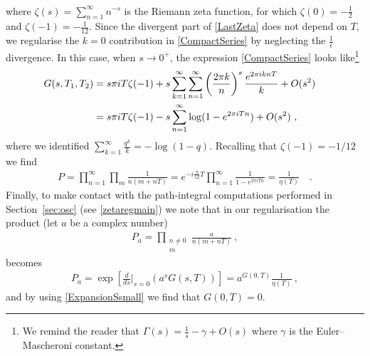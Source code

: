 \documentclass[11pt]{article}
\numberwithin{equation}{section}
\begin{document}
\begin{appendix}
\begin{align}
\label{LastZeta}
\end{align}
where $\zeta(s)=\sum_{n=1}^{\infty}n^{-s}$ is the Riemann zeta function, for which $\zeta(0)=-\frac12$ and $\zeta(-1)=-\frac1{12}$. Since the divergent part of \eqref{LastZeta} does not depend on $T$, we regularise the $k=0$ contribution in \eqref{CompactSeries} by neglecting the $\frac1\epsilon$ divergence. In this case, when $s\to 0^+$, the expression \eqref{CompactSeries} looks like\footnote{We remind the reader that $\Gamma(s)=\frac1s-\gamma+O(s)$ where $\gamma$ is the Euler--Mascheroni constant.}
\begin{align}
{G}(s, T_1, T_2) &=s \pi i T \zeta(-1)+s \sum_{k=1}^{\infty} \sum_{n = 1}^{\infty} \left(\frac{2\pi k}{n}\right)^s \frac{e^{2\pi i k n T}}{k}  +O(s^2)\cr
&=s \pi i T \zeta(-1)-s \sum_{n = 1}^{\infty}\log(1-e^{2\pi i T n})  +O(s^2)\ ,
\label{ExpansionSsmall}
\end{align}
where we identified  $\sum_{k=1}^{\infty}\frac{q^k}{k}=-\log(1-q)$.
Recalling that $\zeta(-1)=-1/12$ we find
\begin{align}
P=\prod_{n=1}^\infty\prod_{m}\frac{1 }{n(m + n T)}= e^{-i\frac{\pi}{12}T} \prod_{n=1}^{\infty}\frac1{1-e^{2\pi i T n}} =\frac1{\eta(T) }\quad.
\end{align}
Finally, to make contact with the path-integral computations performed in Section~\ref{sec:osc} (see \eqref{zetaregmain}) we note that in our regularisation the product (let $a$ be a complex number)
\begin{align}
P_a=\prod_{\substack{n \neq 0 \\ m}}\frac{a }{n(m + n T)}\ ,
\end{align}
becomes 
\begin{align}
P_a=\exp\left[\frac{d}{ds}\Bigg|_{s=0}(a^s G(s,T)) \right]=a^{G(0,T)}\frac1{ \eta(T)  }\ ,
\end{align}
and by using \eqref{ExpansionSsmall} we find that $G(0,T)=0$.

 \end{appendix}



\end{document}
